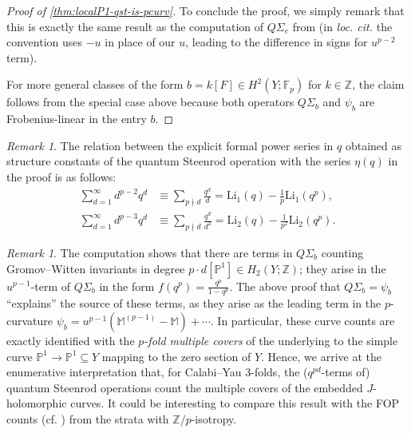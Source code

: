 \documentclass[reqno]{amsart}
\numberwithin{equation}{section}
\numberwithin{equation}{section}
\numberwithin{equation}{section}
\theoremstyle{definition}
\theoremstyle{remark}
\theoremstyle{remark}
\newtheorem{rem}[thm]{Remark}
\begin{document}
\begin{proof}[Proof of \cref{thm:localP1-qst-is-pcurv}]
To conclude the proof, we simply remark that this is exactly the same result as the computation of $Q\Sigma_e$ from \cite[Corollary 4.16]{Lee23a} (in \emph{loc. cit.} the convention uses $-u$ in place of our $u$, leading to the difference in signs for $u^{p-2}$ term). 

For more general classes of the form $b = k[F] \in H^2(Y;\mathbb{F}_p)$ for $k \in \mathbb{Z}$, the claim follows from the special case above because both operators $Q\Sigma_b$ and $\psi_b$ are Frobenius-linear in the entry $b$.
\end{proof}



\begin{rem}
    The relation between the explicit formal power series in $q$ obtained as structure constants of the quantum Steenrod operation with the series $\eta(q)$ in the proof is as follows:
    \begin{align*}
        \sum_{d=1}^{\infty} d^{p-2}q^d &\equiv \sum_{p \nmid d} \frac{q^d}{d} = \mathrm{Li}_1 (q) - \frac{1}{p} \mathrm{Li}_1(q^p), \\
        \sum_{d=1}^\infty d^{p-3}q^d &\equiv \sum_{p \nmid d} \frac{q^d}{d^2} = \mathrm{Li}_2 (q) - \frac{1}{p^2} \mathrm{Li}_2(q^p).
    \end{align*}
    
\end{rem}

\begin{rem}\label{rem:enumerative-interpretation-qst}
    The computation shows that there are terms in $Q\Sigma_b$ counting Gromov--Witten invariants in degree $p\cdot d[\mathbb{P}^1] \in H_2(Y;\mathbb{Z})$; they arise in the $u^{p-1}$-term of $Q\Sigma_b$ in the form $f(q^p) = \frac{q^p}{1-q^p}$. The above proof that $Q\Sigma_b = \psi_b$ ``explains'' the source of these terms, as they arise as the leading term in the $p$-curvature $\psi_b = u^{p-1} (\mathbb{M}^{(p-1)} - \mathbb{M}) + \cdots$. In particular, these curve counts are exactly identified with the \emph{$p$-fold multiple covers} of the underlying to the simple curve $\mathbb{P}^1 \to \mathbb{P}^1 \subseteq Y$ mapping to the zero section of $Y$. Hence, we arrive at the enumerative interpretation that, for Calabi--Yau 3-folds, the ($q^{pd}$-terms of) quantum Steenrod operations count the multiple covers of the embedded $J$-holomorphic curves. It could be interesting to compare this result with the FOP counts (cf. \cite{Bai-Xu-FOP1}) from the strata with $\mathbb{Z}/p$-isotropy.
\end{rem}
\end{document}
